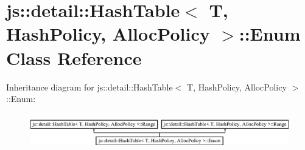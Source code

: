 \hypertarget{classjs_1_1detail_1_1_hash_table_1_1_enum}{\section{js\-:\-:detail\-:\-:Hash\-Table$<$ T, Hash\-Policy, Alloc\-Policy $>$\-:\-:Enum Class Reference}
\label{classjs_1_1detail_1_1_hash_table_1_1_enum}
}
Inheritance diagram for js\-:\-:detail\-:\-:Hash\-Table$<$ T, Hash\-Policy, Alloc\-Policy $>$\-:\-:Enum\-:\begin{figure}[H]
\begin{center}
\leavevmode
\includegraphics[height=1.600000cm]{classjs_1_1detail_1_1_hash_table_1_1_enum}
\end{center}
\end{figure}
